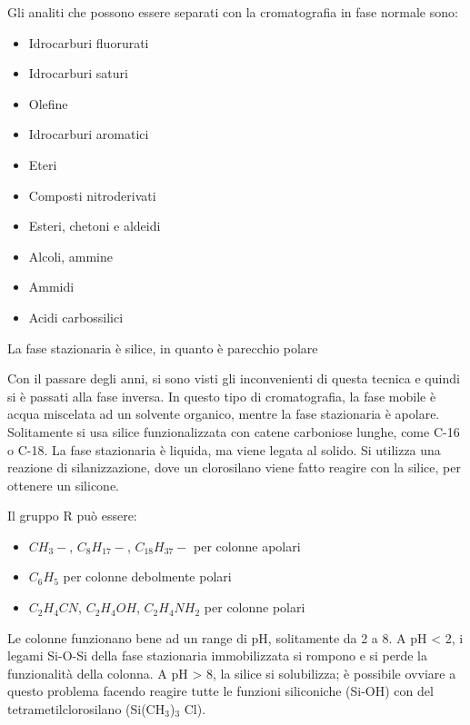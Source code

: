 Gli analiti che possono essere separati con la cromatografia in fase normale sono:
\begin{itemize}
\item Idrocarburi fluorurati
\item Idrocarburi saturi
\item Olefine
\item Idrocarburi aromatici
\item Eteri
\item Composti nitroderivati
\item Esteri, chetoni e aldeidi
\item Alcoli, ammine
\item Ammidi
\item Acidi carbossilici
\end{itemize}

La fase stazionaria è silice, in quanto è parecchio polare

Con il passare degli anni, si sono visti gli inconvenienti di questa tecnica e quindi si è passati alla fase inversa. In questo tipo di cromatografia, la fase mobile è acqua miscelata ad un solvente organico, mentre la fase stazionaria è apolare. Solitamente si usa silice funzionalizzata con catene carboniose lunghe, come C-16 o C-18. La fase stazionaria è liquida, ma viene legata al solido. Si utilizza una reazione di silanizzazione, dove un clorosilano viene fatto reagire con la silice, per ottenere un silicone.


Il gruppo R può essere:
\begin{itemize}
\item $CH_3-$, $C_8H_{17}-$, $C_{18}H_{37}-$ per colonne apolari
\item $C_6H_5$ per colonne debolmente polari
\item $C_2H_4CN$, $C_2H_4OH$, $C_2H_4NH_2$ per colonne polari
\end{itemize}

Le colonne funzionano bene ad un range di pH, solitamente da 2 a 8. A pH < 2, i legami Si-O-Si della fase stazionaria immobilizzata si rompono e si perde la funzionalità della colonna. A pH > 8, la silice si solubilizza; è possibile ovviare a questo problema facendo reagire tutte le funzioni siliconiche (Si-OH) con del tetrametilclorosilano (Si(CH$_3$)$_3$ Cl).

